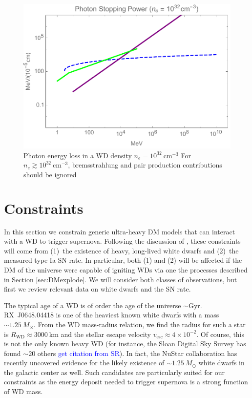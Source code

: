 \documentclass[twocolumn,showpacs,preprintnumbers,amsmath,amssymb,prd]{revtex4}
\begin{document}
\begin{figure}
\includegraphics[scale=.45]{SPphoton.pdf}
\caption{Photon energy loss in a WD density $n_e = 10^{32} ~\text{cm}^{-3}$ For $n_e \gtrsim 10^{32} ~\text{cm}^{-3}$, bremsstrahlung and pair production contributions should be ignored}
\label{fig:SPphoton}
\end{figure}

\section{Constraints}
\label{sec:Constraints}

In this section we constrain generic ultra-heavy DM models that can interact with a WD to trigger supernova. Following the discussion of \cite{Graham:2015apa}, these constraints will come from (1)~the existence of heavy, long-lived white dwarfs and (2)~the measured type Ia SN rate. In particular, both (1) and (2) will be affected if the DM of the universe were capable of igniting WDs via one the processes described in Section \ref{sec:DMexplode}. We will consider both classes of observations, but first we review relevant data on white dwarfs and the SN rate.

The typical age of a WD is of order the age of the universe $\sim \text{Gyr}$. RX~J0648.04418 is one of the heaviest known white dwarfs with a mass $\sim 1.25 ~M_{\odot}$. From the WD mass-radius relation, we find the radius for such a star is $R_\text{WD} \approx 3000~\text{km}$ and the stellar escape velocity $v_\text{esc} \approx 4 \times 10^{-2}$. Of course, this is not the only known heavy WD (for instance, the Sloan Digital Sky Survey has found $\sim 20$ others \textcolor{blue}{get citation from SR}). In fact, the NuStar collaboration has recently uncovered evidence for the likely existence of $\sim 1.25 ~M_{\odot}$ white dwarfs in the galactic center as well. Such candidates are particularly suited for our constraints as the energy deposit needed to trigger supernova is a strong function of WD mass. 
\end{document}
